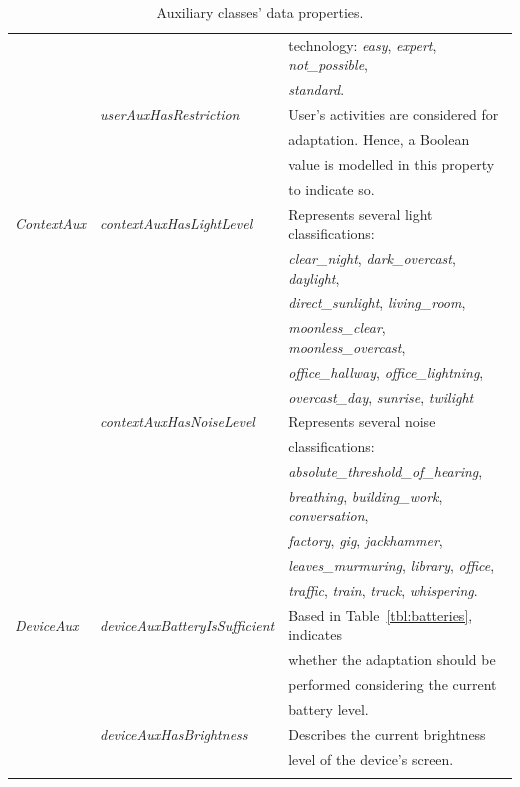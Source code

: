 \begin{center}
\begin{longtable}{l l l}
			& 					& technology: \textit{easy}, \textit{expert}, \textit{not\_possible}, 	\\
			&					& \textit{standard}.			\\
			& \textit{userAuxHasRestriction}	& User's activities are considered for	\\
			&					&  adaptation. Hence, a Boolean	\\
			& 					& value is modelled in this property 	\\
			& 					& to indicate so.			\\
  \textit{ContextAux}	& \textit{contextAuxHasLightLevel}	& Represents several light classifications: 				\\
			& 					& \textit{clear\_night}, \textit{dark\_overcast}, \textit{daylight}, 	\\
			& 					& \textit{direct\_sunlight}, \textit{living\_room},  			\\
			& 					& \textit{moonless\_clear}, \textit{moonless\_overcast},  		\\ 
			& 					& \textit{office\_hallway}, \textit{office\_lightning}, 		\\
			&					& \textit{overcast\_day}, \textit{sunrise}, \textit{twilight} 		\\
			& \textit{contextAuxHasNoiseLevel}	& Represents several noise 		\\
			&					& classifications:			\\
			&					& \textit{absolute\_threshold\_of\_hearing}, 				\\
			& 					& \textit{breathing}, \textit{building\_work}, \textit{conversation}, 	\\
			& 					& \textit{factory}, \textit{gig}, \textit{jackhammer}, 			\\ 
			& 					& \textit{leaves\_murmuring}, \textit{library}, \textit{office}, 	\\
			&					& \textit{traffic}, \textit{train}, \textit{truck}, \textit{whispering}.\\
  \textit{DeviceAux}	& \textit{deviceAuxBatteryIsSufficient}& Based in Table~\ref{tbl:batteries}, indicates \\
  			& 					& whether the adaptation should be   	\\
  			& 					& performed considering the current 	\\
  			&					& battery level.			\\
  			& \textit{deviceAuxHasBrightness}	& Describes the current brightness 	\\
  			& 					& level of the device’s screen.		\\
  \hline
\caption{Auxiliary classes' data properties.}\\
\end{longtable}
\end{center}




